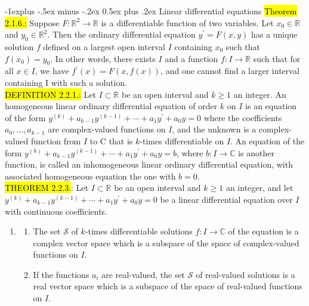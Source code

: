 \documentclass[10pt,landscape]{article}
\makeatletter
\newcommand{\green}[1]{\sethlcolor{green}\hl{#1}}
\newcommand{\blue}[1]{\sethlcolor{cyan} \hl{#1}}
\renewcommand{\subsection}{\@startsection{subsection}{2}{0mm}%
                                {-1explus -.5ex minus -.2ex}%
                                {0.5ex plus .2ex}%
                                {\normalfont\normalsize\bfseries}}
\makeatother
\begin{document}
\begin{multicols}{3}
\subsection{Linear differential equations}
\green{Theorem 2.1.6.:} Suppose $F: \mathbb{R}^{2} \rightarrow \mathbb{R}$ is a differentiable function of two variables. 
Let $x_{0} \in \mathbb{R}$ and $y_{0} \in \mathbb{R}^{2}$. Then the ordinary differential equation
$y^{\prime}=F(x, y)$ has a unique solution $f$ defined on a largest open interval $I$ 
containing $x_{0}$ such that $f\left(x_{0}\right)=y_{0} .$ In other words, 
there exists $I$ and a function $f: I \rightarrow \mathbb{R}$ 
such that for all $x \in I$, we have $f^{\prime}(x)=F(x, f(x))$,
and one cannot find a larger interval containing I with such a solution.\\
\blue{DEFINITION 2.2.1.:} Let $I \subset \mathbb{R}$ be an open interval and $k \geqslant 1$ an integer. An homogeneous linear ordinary differential equation 
of order $k$ on $I$ is an equation of the form $y^{(k)}+a_{k-1} y^{(k-1)}+\cdots+a_{1} y^{\prime}+a_{0} y=0$
where the coefficients $a_{0}, \ldots, a_{k-1}$ are complex-valued functions on $I$, and the unknown is a complex-valued function from $I$ to $\mathrm{C}$ that is $k$-times differentiable on $I$.
An equation of the form $y^{(k)}+a_{k-1} y^{(k-1)}+\cdots+a_{1} y^{\prime}+a_{0} y=b$,
where $b: I \rightarrow \mathbb{C}$ is another function, is called an inhomogeneous linear ordinary differential equation, with associated homogeneous equation the one with $b=0$.\\
\green{THEOREM 2.2.3.}: Let $I \subset \mathbb{R}$ be an open interval and $k \geqslant 1$ an integer, and let
$y^{(k)}+a_{k-1} y^{(k-1)}+\cdots+a_{1} y^{\prime}+a_{0} y=0$
be a linear differential equation over $I$ with continuous coefficients.
\begin{enumerate}
        \item \begin{enumerate}
                \item The set $\mathcal{S}$ of $k$-times differentiable solutions $f: I \rightarrow \mathbb{C}$ of the
                equation is a complex vector space which is a subspace of the space of complex-valued functions on $I$.
                \item If the functions $a_{i}$ are real-valued, the set $\mathcal{S}$ of real-valued solutions is a real vector 
                space which is a subspace of the space of real-valued functions on $I$.
        \end{enumerate}

\end{enumerate}
\end{multicols}
\end{document}
